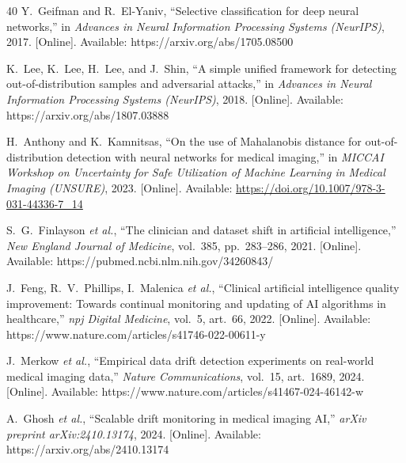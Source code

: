 \documentclass[conference, letterpaper]{IEEEtran}
\begin{document}
\begin{thebibliography}{40}
Y.~Geifman and R.~El-Yaniv, ``Selective classification for deep neural networks,'' in \textit{Advances in Neural Information Processing Systems (NeurIPS)}, 2017. [Online]. Available: https://arxiv.org/abs/1705.08500

K.~Lee, K.~Lee, H.~Lee, and J.~Shin, ``A simple unified framework for detecting out-of-distribution samples and adversarial attacks,'' in \textit{Advances in Neural Information Processing Systems (NeurIPS)}, 2018. [Online]. Available: https://arxiv.org/abs/1807.03888

H.~Anthony and K.~Kamnitsas, ``On the use of Mahalanobis distance for out-of-distribution detection with neural networks for medical imaging,'' in \textit{MICCAI Workshop on Uncertainty for Safe Utilization of Machine Learning in Medical Imaging (UNSURE)}, 2023. [Online]. Available: \url{https://doi.org/10.1007/978-3-031-44336-7_14}

S.~G.~Finlayson \textit{et al.}, ``The clinician and dataset shift in artificial intelligence,'' \textit{New England Journal of Medicine}, vol.~385, pp.~283--286, 2021. [Online]. Available: https://pubmed.ncbi.nlm.nih.gov/34260843/

J.~Feng, R.~V.~Phillips, I.~Malenica \textit{et al.}, ``Clinical artificial intelligence quality improvement: Towards continual monitoring and updating of AI algorithms in healthcare,'' \textit{npj Digital Medicine}, vol.~5, art.~66, 2022. [Online]. Available: https://www.nature.com/articles/s41746-022-00611-y

J.~Merkow \textit{et al.}, ``Empirical data drift detection experiments on real-world medical imaging data,'' \textit{Nature Communications}, vol.~15, art.~1689, 2024. [Online]. Available: https://www.nature.com/articles/s41467-024-46142-w

A.~Ghosh \textit{et al.}, ``Scalable drift monitoring in medical imaging AI,'' \textit{arXiv preprint arXiv:2410.13174}, 2024. [Online]. Available: https://arxiv.org/abs/2410.13174

\end{thebibliography}
\end{document}
